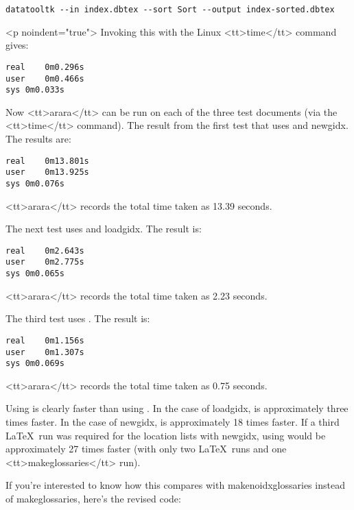 \begin{verbatim}
datatooltk --in index.dbtex --sort Sort --output index-sorted.dbtex
\end{verbatim}
   <p noindent="true">
   Invoking this with the Linux <tt>time</tt> command gives:

\begin{verbatim}
real	0m0.296s
user	0m0.466s
sys	0m0.033s
\end{verbatim}

   Now <tt>arara</tt> can be run on each of the three test documents 
   (via the <tt>time</tt> command). The result from the first test
   that uses  and \gls{newgidx}. The results are:

\begin{verbatim}
real	0m13.801s
user	0m13.925s
sys	0m0.076s
\end{verbatim}

  <tt>arara</tt> records the total time taken as 13.39 seconds.


  The next test uses  and \gls{loadgidx}. 
  The result is:

\begin{verbatim}
real	0m2.643s
user	0m2.775s
sys	0m0.065s
\end{verbatim}

  <tt>arara</tt> records the total time taken as 2.23 seconds.


  The third test uses . The result is:

\begin{verbatim}
real	0m1.156s
user	0m1.307s
sys	0m0.069s
\end{verbatim}

  <tt>arara</tt> records the total time taken as 0.75 seconds.


   Using  is clearly faster than using
   . In the case of \gls{loadgidx},
    is approximately three times faster. In the 
   case of \gls{newgidx},  is approximately 
  18 times faster. If a third \LaTeX\ run was required
  for the location lists with \gls{newgidx}, using  would be approximately 
  27 times faster (with only two \LaTeX\ runs and one <tt>makeglossaries</tt> run).


   If you're interested to know how this compares with \gls{makenoidxglossaries} instead of \gls{makeglossaries}, here's the revised 
    code:



